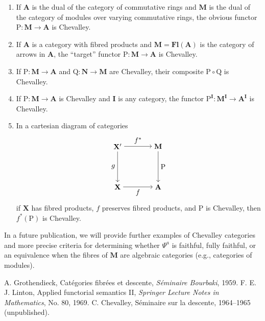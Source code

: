\documentclass{article}
\begin{document}
\begin{enumerate}
    \item If $\mathbf{A}$ is the dual of the category of commutative rings and $\mathbf{M}$ is the dual of the category of modules over varying commutative rings, the obvious functor $\mathrm{P} : \mathbf{M} \to \mathbf{A}$ is Chevalley.
    \item If $\mathbf{A}$ is a category with fibred products and $\mathbf{M} = \mathbf{Fl}(\mathbf{A})$ is the category of arrows in $\mathbf{A}$, the ``target'' functor $\mathrm{P} : \mathbf{M} \to \mathbf{A}$ is Chevalley.
    \item If $\mathrm{P} : \mathbf{M} \to \mathbf{A}$ and $\mathrm{Q} : \mathbf{N} \to \mathbf{M}$ are Chevalley, their composite $\mathrm{P} \circ \mathrm{Q}$ is Chevalley.
    \item If $\mathrm{P} : \mathbf{M} \to \mathbf{A}$ is Chevalley and $\mathbf{I}$ is any category, the functor $\mathrm{P}^{\mathbf{I}} : \mathbf{M}^{\mathbf{I}} \to \mathbf{A}^{\mathbf{I}}$ is Chevalley.
    \item In a cartesian diagram of categories
    \[
    \begin{tikzpicture}
        \node (X') at (0,2) {$\mathbf{X}'$};
        \node (M) at (2,2) {$\mathbf{M}$};
        \node (X) at (0,0) {$\mathbf{X}$};
        \node (A) at (2,0) {$\mathbf{A}$};
        \draw[->] (X') to node[above] {$f^*$} (M);
        \draw[->] (X') to node[left] {$g$} (X);
        \draw[->] (M) to node[right] {$\mathrm{P}$} (A);
        \draw[->] (X) to node[below] {$f$} (A);
    \end{tikzpicture}
    \]
    if $\mathbf{X}$ has fibred products, $f$ preserves fibred products, and $\mathrm{P}$ is Chevalley, then $f^*(\mathrm{P})$ is Chevalley.
\end{enumerate}

In a future publication, we will provide further examples of Chevalley categories and more precise criteria for determining whether $\Psi^a$ is faithful, fully faithful, or an equivalence when the fibres of $\mathbf{M}$ are algebraic categories (e.g., categories of modules).

\begin{thebibliography}{9}
 A. Grothendieck, Cat\'egories fibr\'ees et descente, \emph{S\'eminaire Bourbaki}, 1959.
 F. E. J. Linton, Applied functorial semantics II, \emph{Springer Lecture Notes in Mathematics}, No. 80, 1969.
 C. Chevalley, S\'eminaire sur la descente, 1964--1965 (unpublished).
\end{thebibliography}
\end{document}
